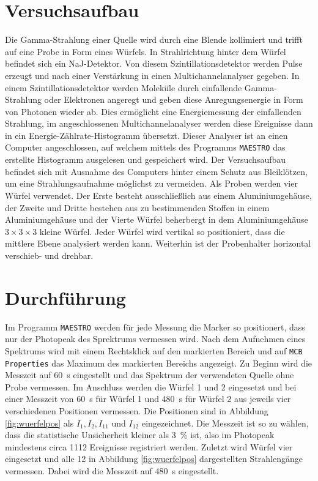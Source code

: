 \newpage
\section{Versuchsaufbau}
\label{sec:Aufbau}

Die Gamma-Strahlung einer 
Quelle wird durch eine Blende kollimiert und trifft auf eine Probe in Form
eines Würfels.
In Strahlrichtung hinter dem Würfel befindet sich ein NaJ-Detektor.
Von diesem Szintillationsdetektor werden Pulse erzeugt
und nach einer Verstärkung in einen Multichannelanalyser gegeben.
In einem Szintillationsdetektor werden Moleküle durch einfallende Gamma-Strahlung
oder Elektronen angeregt und geben diese Anregungsenergie in Form von Photonen
wieder ab. Dies ermöglicht eine Energiemessung der einfallenden Strahlung,
im angeschlossenen Multichannelanalyser werden diese Ereignisse dann in ein
Energie-Zählrate-Histogramm übersetzt.
Dieser Analyser ist an einen Computer angeschlossen,
auf welchem mittels des Programms \texttt{MAESTRO}
das erstellte Histogramm ausgelesen und gespeichert wird.
Der Versuchsaufbau befindet sich mit Ausnahme des Computers hinter einem
Schutz aus Bleiklötzen, um eine Strahlungsaufnahme möglichst zu vermeiden.
Als Proben werden vier Würfel verwendet.
Der Erste besteht ausschließlich aus einem Aluminiumgehäuse, der Zweite und Dritte
bestehen aus zu bestimmenden Stoffen in einem Aluminiumgehäuse
und der Vierte Würfel beherbergt in dem Aluminiumgehäuse $3 \times 3 \times 3$
kleine Würfel.
Jeder Würfel wird vertikal so positioniert, dass die mittlere Ebene analysiert
werden kann. Weiterhin ist der Probenhalter horizontal verschieb- und drehbar.

\section{Durchführung}
\label{sec:Durchführung}

Im Programm \texttt{MAESTRO} werden für jede Messung die Marker so positionert,
dass nur der Photopeak des Sprektrums vermessen wird.
Nach dem Aufnehmen eines Spektrums
wird mit einem Rechtsklick auf den markierten Bereich und auf
\texttt{MCB Properties} das Maximum des markierten Bereichs angezeigt.
Zu Beginn wird die Messzeit auf \SI{60}{\second} eingestellt und das Spektrum
der verwendeten Quelle ohne Probe vermessen. Im Anschluss werden die
Würfel \num{1} und \num{2} eingesetzt und bei einer Messzeit von
\SI{60}{\second} für Würfel \num{1} und \SI{480}{\second} für Würfel \num{2}
aus jeweils vier verschiedenen Positionen vermessen. Die Positionen sind
in Abbildung \ref{fig:wuerfelpos} als
$I_{1}, I_{2}, I_{11}$ und $I_{12}$ eingezeichnet.
Die Messzeit ist so zu wählen, dass die statistische Unsicherheit kleiner
als \SI{3}{\percent} ist, also im Photopeak mindestens circa \num{1112}
Ereignisse registriert werden.
Zuletzt wird Würfel vier eingesetzt und alle \num{12} in Abbildung
\ref{fig:wuerfelpos} dargestellten Strahlengänge vermessen. Dabei wird die
Messzeit auf \SI{480}{\second} eingestellt.

